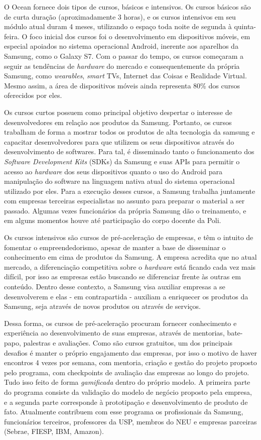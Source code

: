 O Ocean fornece dois tipos de cursos, básicos e intensivos. Os cursos básicos são de curta duração (aproximadamente 3 horas), e os cursos intensivos em seu módulo atual duram 4 meses, utilizando o espaço toda noite de segunda à quinta-feira. O foco inicial dos cursos foi o desenvolvimento em dispositivos móveis, em especial apoiados no sistema operacional Android, inerente aos aparelhos da Samsung, como o Galaxy S7. Com o passar do tempo, os cursos começaram a seguir as tendências de \textit{hardware} do mercado e consequentemente da própria Samsung, como \textit{wearables}, \textit{smart} TVs, Internet das Coisas e Realidade Virtual. Mesmo assim, a área de dispositivos móveis ainda representa 80\% dos cursos oferecidos por eles.

Os cursos curtos possuem como principal objetivo despertar o interesse de desenvolvedores em relação aos produtos da Samsung. Portanto, os cursos trabalham de forma a mostrar todos os produtos de alta tecnologia da samsung e capacitar desenvolvedores para que utilizem os seus dispositivos através do desenvolvimento de softwares. Para tal, é disseminado tanto o funcionamento dos \textit{Software Development Kits} (SDKs) da Samsung e suas APIs para permitir o acesso ao \textit{hardware} dos seus dispositivos quanto o uso do Android para manipulação do software na linguagem nativa atual do sistema operacional utilizado por eles. Para a execução desses cursos, a Samsung trabalha juntamente com empresas terceiras especialistas no assunto para preparar o material a ser passado. Algumas vezes funcionários da própria Samsung dão o treinamento, e em alguns momentos houve até participação do corpo docente da Poli.

Os cursos intensivos são cursos de pré-aceleração de empresas, e têm o intuito de fomentar o empreendedorismo, apesar de manter a base de disseminar o conhecimento em cima de produtos da Samsung. A empresa acredita que no atual mercado, a diferenciação competitiva sobre o \textit{hardware} está ficando cada vez mais difícil, por isso as empresas estão buscando se diferenciar frente às outras em conteúdo. Dentro desse contexto, a Samsung visa auxiliar empresas a se desenvolverem e elas - em contrapartida - auxiliam a enriquecer os produtos da Samsung, seja através de novos produtos ou através de serviços.

Dessa forma, os cursos de pré-aceleração procuram fornecer conhecimento e experiência ao desenvolvimento de suas empresas, através de mentorias, bate-papo, palestras e avaliações. Como são cursos gratuitos, um dos principais desafios é manter o próprio engajamento das empresas, por isso o motivo de haver encontros 4 vezes por semana, com mentoria, criação e gestão do projeto proposto pelo programa, com checkpoints de avaliação das empresas ao longo do projeto. Tudo isso feito de forma \textit{gamificada} dentro do próprio modelo. A primeira parte do programa consiste da validação do modelo de negócio proposto pela empresa, e a segunda parte corresponde à prototipação e desenvolvimento de produto de fato. Atualmente contribuem com esse programa os profissionais da Samsung, funcionários terceiros, professores da USP, membros do NEU e empresas parceiras (Sebrae, FIESP, IBM, Amazon).


